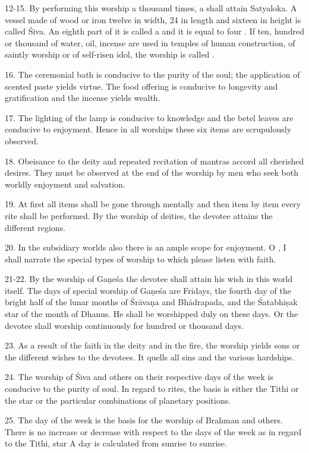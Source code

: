 12-15. By performing this worship a thousand times, a  shall attain
Satyaloka. A vessel made of wood or iron twelve  in width, 24
 in length and sixteen  in height is called Śiva. An
eighth part of it is called a  and it is equal to four .
If ten, hundred or thousand  of water, oil, incense \etc are used
in temples of human construction, of saintly worship or of self-risen idol,
the worship is called .

16. The ceremonial bath is conducive to the purity of the soul; the application
of scented paste yields virtue. The food offering is conducive to longevity and
gratification and the incense yields wealth.

17. The lighting of the lamp is conducive to knowledge and the betel leaves are
conducive to enjoyment. Hence in all worships these six items are scrupulously
observed.

18. Obeisance to the deity and repeated recitation of mantras accord all
cherished desires. They must be observed at the end of the worship by men who
seek both worldly enjoyment and salvation.

19. At first all items shall be gone through mentally and then item by item
every rite shall be performed. By the worship of deities, the devotee attains
the different regions.

20. In the subsidiary worlds also there is an ample scope for enjoyment.
O , I shall narrate the special types of worship to which please
listen with faith.

21-22. By the worship of Gaṇeśa the devotee shall attain his wish in this world
itself. The days of special worship of Gaṇeśa are Fridays, the fourth day of
the bright half of the lunar months of Śrāvaṇa and Bhādrapada, and
the Śatabhiṣak star of the month of Dhanus. He shall be worshipped duly on
these days. Or the devotee shall worship continuously for hundred or thousand
days.

23. As a result of the faith in the deity and in the fire, the worship yields
sons or the different wishes to the devotees. It quells all sins and the various
hardships.

24. The worship of Śiva and others on their respective days of the week is
conducive to the purity of soul. In regard to  rites, the basis is
either the Tithi or the star or the particular combinations of planetary
positions.

25. The day of the week is the basis for the worship of Brahman and others.
There is no increase or decrease with respect to the days of the week as in
regard to the Tithi, star \etc A day is calculated from sunrise to sunrise.

